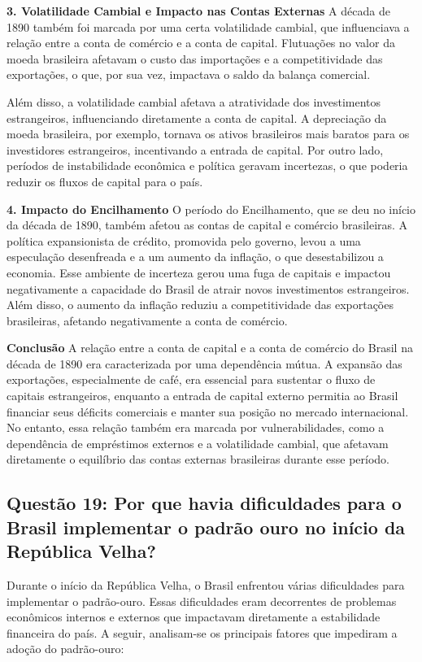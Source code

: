 \documentclass[a4paper,12pt]{article}[abntex2]
\begin{document}
\textbf{3. Volatilidade Cambial e Impacto nas Contas Externas}
A década de 1890 também foi marcada por uma certa volatilidade cambial, que influenciava a relação entre a conta de comércio e a conta de capital. Flutuações no valor da moeda brasileira afetavam o custo das importações e a competitividade das exportações, o que, por sua vez, impactava o saldo da balança comercial.

Além disso, a volatilidade cambial afetava a atratividade dos investimentos estrangeiros, influenciando diretamente a conta de capital. A depreciação da moeda brasileira, por exemplo, tornava os ativos brasileiros mais baratos para os investidores estrangeiros, incentivando a entrada de capital. Por outro lado, períodos de instabilidade econômica e política geravam incertezas, o que poderia reduzir os fluxos de capital para o país.

\textbf{4. Impacto do Encilhamento}
O período do Encilhamento, que se deu no início da década de 1890, também afetou as contas de capital e comércio brasileiras. A política expansionista de crédito, promovida pelo governo, levou a uma especulação desenfreada e a um aumento da inflação, o que desestabilizou a economia. Esse ambiente de incerteza gerou uma fuga de capitais e impactou negativamente a capacidade do Brasil de atrair novos investimentos estrangeiros. Além disso, o aumento da inflação reduziu a competitividade das exportações brasileiras, afetando negativamente a conta de comércio.

\textbf{Conclusão}
A relação entre a conta de capital e a conta de comércio do Brasil na década de 1890 era caracterizada por uma dependência mútua. A expansão das exportações, especialmente de café, era essencial para sustentar o fluxo de capitais estrangeiros, enquanto a entrada de capital externo permitia ao Brasil financiar seus déficits comerciais e manter sua posição no mercado internacional. No entanto, essa relação também era marcada por vulnerabilidades, como a dependência de empréstimos externos e a volatilidade cambial, que afetavam diretamente o equilíbrio das contas externas brasileiras durante esse período.

\subsection{\textbf{Questão 19: Por que havia dificuldades para o Brasil implementar o padrão ouro no início da República Velha?}}

Durante o início da República Velha, o Brasil enfrentou várias dificuldades para implementar o padrão-ouro. Essas dificuldades eram decorrentes de problemas econômicos internos e externos que impactavam diretamente a estabilidade financeira do país. A seguir, analisam-se os principais fatores que impediram a adoção do padrão-ouro:
\end{document}
